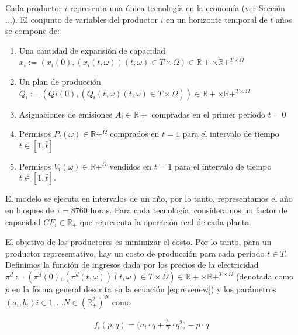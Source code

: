  Cada productor $i$ representa una única tecnología en la economía (ver Sección ...). El conjunto de variables del productor $i$ en un horizonte temporal de $\bar{t}$ años se compone de: 
 \begin{enumerate}

\item 
Una cantidad de expansión de capacidad $x_i:=\left(x_i(0),(x_i(t,\omega)){(t,\omega)\in T\times\Omega}\right)\in\mathbb{R}+\times\mathbb{R}+^{T\times\Omega}$
 \item 
 Un plan de producción $Q_i:=\left(Q{i}(0),(Q_{i}(t,\omega){(t,\omega)\in T\times\Omega})\right)\in\mathbb{R}+\times\mathbb{R}+^{T\times\Omega}$
 \item 
 Asignaciones de emisiones $A_i\in\mathbb{R}+$ compradas en el primer período $t=0$
 \item 
 Permisos $P_i(\omega)\in\mathbb{R}+^{\Omega}$ comprados en $t=1$ para el intervalo de tiempo $t\in[1,\bar{t}]$
 \item 
 Permisos $V_i(\omega)\in\mathbb{R}+^{\Omega}$ vendidos en $t=1$ para el intervalo de tiempo $t\in[1,\bar{t}]$.

\end{enumerate}
El modelo se ejecuta en intervalos de un año, por lo tanto, representamos el año en bloques de $\tau=8760$ horas. Para cada tecnología, consideramos un factor de capacidad $CF_i\in\mathbb{R}_+$ que representa la operación real de cada planta.
\vspace{2.5mm}

El objetivo de los productores es minimizar el costo. Por lo tanto, para un productor representativo, hay un costo de producción para cada período $t\in T$. Definimos la función de ingresos dada por los precios de la electricidad $\pi^d:=\left(\pi^d(0),\left(\pi^d(t,\omega)\right){(t,\omega)\in T\times\Omega}\right)\in\mathbb{R}+\times\mathbb{R}+^{T\times\Omega}$ (denotada como $p$ en la forma general descrita en la ecuación \ref{eq:revenew}) y los parámetros $(a_i,b_i){i\in{1,...N}}\in(\mathbb{R}^2_+)^N$ como

\begin{align}\label{eq:revenew}
f_i(p,q)=\Big(a_i\cdot q+\frac{b_i}{2}\cdot q^{2}\Big)-p\cdot q.
\end{align}
\vspace{2.5mm}

